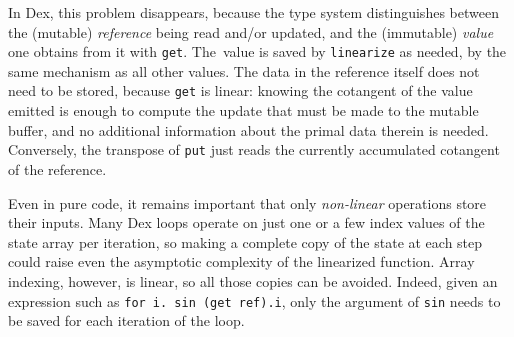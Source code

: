 \documentclass[acmsmall,screen,nonacm]{acmart}
\newcommand{\ttt}[1]{\texttt{#1}}
\begin{document}
In Dex, this problem disappears, because the type system distinguishes between the (mutable) \emph{reference} being read and/or updated, and the (immutable) \emph{value} one obtains from it with \verb|get|.
The~value is saved by \texttt{linearize} as needed, by the same mechanism as all other values.
The data in the reference itself does not need to be stored, because \verb|get| is linear: knowing the cotangent of the value emitted is enough to compute the update that must be made to the mutable buffer, and no additional information about the primal data therein is needed.
Conversely, the transpose of \verb|put| just reads the currently accumulated cotangent of the reference.

Even in pure code, it remains important that only \emph{non-linear} operations store their inputs.
Many Dex loops operate on just one or a few index values of the state array per iteration, so
making a complete copy of the state at each step could raise even the asymptotic complexity of the linearized function.
Array indexing, however, is linear, so all those copies can be avoided.
Indeed, given an expression such as \texttt{for i. sin (get ref).i}, only the argument of \ttt{sin} needs to be saved for each iteration of the loop.
\end{document}
